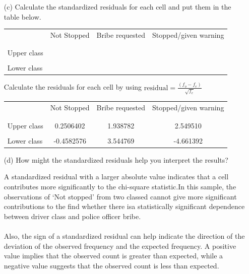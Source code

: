 \documentclass[12pt,letterpaper]{article}
\begin{document}
\begin{enumerate}
	
	
	\newpage
	\item [(c)] Calculate the standardized residuals for each cell and put them in the table below.
	\vspace{1cm}
	
	\begin{table}[h]
		\centering
		\begin{tabular}{l | c c c }
			& Not Stopped & Bribe requested & Stopped/given warning \\
			\\[-1.8ex] 
			\hline \\[-1.8ex]
			Upper class  &  &  &  \\
			\\
			Lower class &  &   &   \\
			
		\end{tabular}
	\end{table}
	
	\vspace{.15cm}
	\noindent Calculate the residuals for each cell by using $\text{residual} = \frac{(f_o - f_e)}{\sqrt{f_e}}$ \\
	
	
	
	\begin{table}[h]
		\centering
		\begin{tabular}{l | c c c }
			& Not Stopped & Bribe requested & Stopped/given warning \\
			\\[-1.8ex] 
			\hline \\[-1.8ex]
			Upper class  & 0.2506402 & 1.938782  &  2.549510\\
			\\
			Lower class & -0.4582576 & 3.544769  & -4.661392  \\
			
		\end{tabular}
	\end{table}
	
	\vspace{.7cm}
	\item [(d)] How might the standardized residuals help you interpret the results?  
	
	\vspace{.15cm}
	\noindent A standardized residual with a larger absolute value indicates that a cell contributes more significantly to the chi-square statistic.In this sample, the observations of ‘Not stopped’ from two classed cannot give more significant contributions to the find whether there isa statistically significant dependence between driver class and police officer bribe. \\
	\\Also, the sign of a standardized residual can help indicate the direction of the deviation of the observed frequency and the expected frequency. A positive value implies that the observed count is greater than expected, while a negative value suggests that the observed count is less than expected.\\
	

\end{enumerate}
\end{document}
